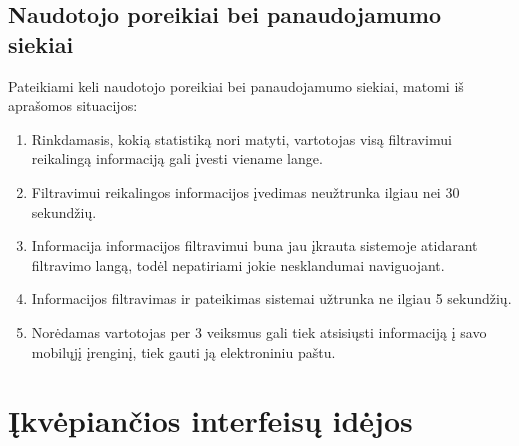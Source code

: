 \documentclass{VUMIFPSkursinis}
\begin{document}
\subsection{Naudotojo poreikiai bei panaudojamumo siekiai}
Pateikiami keli naudotojo poreikiai bei panaudojamumo siekiai, matomi iš aprašomos situacijos:

\begin{enumerate}[start=13,label={\bfseries S\arabic*}]
\item Rinkdamasis, kokią statistiką nori matyti, vartotojas visą filtravimui reikalingą informaciją gali įvesti viename lange.
\item Filtravimui reikalingos informacijos įvedimas neužtrunka ilgiau nei 30 sekundžių.
\item Informacija informacijos filtravimui buna jau įkrauta sistemoje atidarant filtravimo langą, todėl nepatiriami jokie nesklandumai naviguojant.
\item Informacijos filtravimas ir pateikimas sistemai užtrunka ne ilgiau 5 sekundžių.
\item Norėdamas vartotojas per 3 veiksmus gali tiek atsisiųsti informaciją į savo mobilųjį įrenginį, tiek gauti ją elektroniniu paštu.
\end{enumerate}


\section{Įkvėpiančios interfeisų idėjos}
\end{document}
